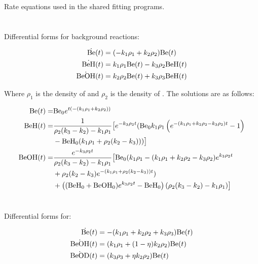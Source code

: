 Rate equations used in the shared fitting programs.

\section{}

Differential forms for background reactions:

\begin{align}
	\dot{\ce{Be}}(t) & = (-k_1 \rho_1 + k_2 \rho_2) \ce{Be}(t) \\
	\dot{\ce{BeH}}(t) & = k_1 \rho_1 \ce{Be}(t) - k_3 \rho_2 \ce{BeH}(t) \\
	\dot{\ce{BeOH}}(t) & = k_2 \rho_2 \ce{Be}(t) + k_3 \rho_3 \ce{BeH}(t)
\end{align}

Where $\rho_1$ is the density of  and $\rho_2$ is the density of . The solutions are as follows:

\begin{align}
	\ce{Be}(t) = & \ce{Be0} e^{t (-(k_1 \rho_1+k_2 \rho_2))} \\
	\ce{BeH}(t) = & \frac{1}{\rho_2 (k_3-k_2)-k_1 \rho_1} \big[e^{-k_3 \rho_2 t} (\ce{Be0} k_1 \rho_1 \left(e^{-(k_1 \rho_1+k_2 \rho_2-k_3 \rho_2)t}-1\right) \\
	& -\ce{BeH0} (k_1 \rho_1+\rho_2 (k_2-k_3)))\big] \\
	\ce{BeOH}(t) = & \frac{e^{-k_3 \rho_2 t}}{\rho_2 (k_3-k_2)-k_1 \rho_1} \big[\ce{Be0} (k_1 \rho_1 - (k_1 \rho_1+k_2 \rho_2-k_3 \rho_2) e^{k_3 \rho_2 t} \\
	& +\rho_2 (k_2-k_3) e^{-(k_1 \rho_1+\rho_2 (k_2-k_3))t}) \\
	& +\left((\ce{BeH0}+\ce{BeOH0}) e^{k_3 \rho_2 t}-\ce{BeH0}\right) (\rho_2 (k_3-k_2)-k_1 \rho_1)\big]
\end{align}

\section{}

Differential forms for:

\begin{align}
	\dot{\ce{Be}}(t) & = -(k_1\rho_1+k_2\rho_2+k_3\rho_3)\ce{Be}(t)\\
	\dot{\ce{BeOH}}(t) & = (k_1\rho_1+(1-\eta)k_2\rho_2)\ce{Be}(t)\\
	\dot{\ce{BeOD}}(t) & = (k_3\rho_3+\eta k_2\rho_2)\ce{Be}(t)
\end{align}

